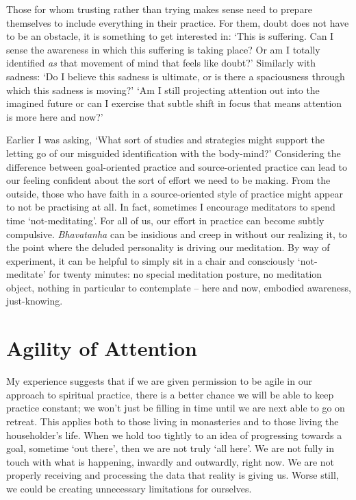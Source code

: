 Those for whom trusting rather than trying makes sense need to prepare
themselves to include everything in their practice. For them, doubt does
not have to be an obstacle, it is something to get interested in: `This
is suffering. Can I sense the awareness in which this suffering is
taking place? Or am I totally identified \emph{as} that movement of mind
that feels like doubt?' Similarly with sadness: `Do I believe this
sadness is ultimate, or is there a spaciousness through which this
sadness is moving?' `Am I still projecting attention out into the
imagined future or can I exercise that subtle shift in focus that means
attention is more here and now?'

Earlier I was asking, `What sort of studies and strategies might support
the letting go of our misguided identification with the body-mind?'
Considering the difference between goal-oriented practice and
source-oriented practice can lead to our feeling confident about the
sort of effort we need to be making. From the outside, those who have
faith in a source-oriented style of practice might appear to not be
practising at all. In fact, sometimes I encourage meditators to spend
time `not-meditating'. For all of us, our effort in practice can become
subtly compulsive. \emph{Bhavatanha} can be insidious and creep in
without our realizing it, to the point where the deluded personality is
driving our meditation. By way of experiment, it can be helpful to
simply sit in a chair and consciously `not-meditate' for twenty minutes:
no special meditation posture, no meditation object, nothing in
\mbox{particular} to contemplate -- here and now, embodied awareness,
just-knowing.

\section{Agility of Attention}

My experience suggests that if we are given permission to be agile in
our approach to spiritual practice, there is a better chance we will be
able to keep practice constant; we won't just be filling in time until
we are next able to go on retreat. This applies both to those living in
monasteries and to those living the householder's life.
When we hold too tightly to an idea of progressing towards a goal, sometime
`out there', then we are not truly `all here'. We are not fully in touch
with what is happening, inwardly and outwardly, right now. We are not
properly receiving and processing the data that reality is giving us.
Worse still, we could be creating unnecessary limitations for ourselves.

